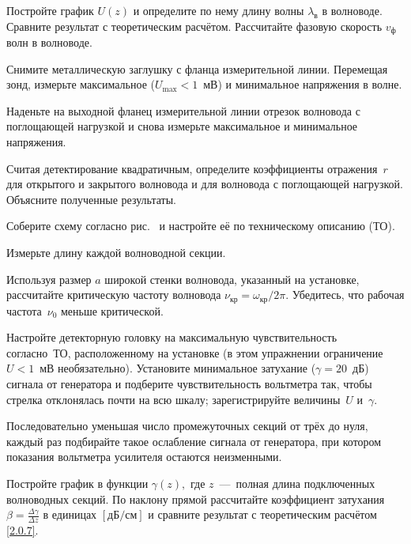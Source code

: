\begin{lab:task}
    \item Постройте график $U(z)$ и определите по нему длину волны
    $\lambda_{\text{в}}$ в волноводе. Сравните результат с теоретическим расчётом.
    Рассчитайте фазовую скорость $v_{\text{ф}}$ волн в волноводе. 
    
    
    \item Снимите металлическую заглушку с фланца измерительной линии. Перемещая
    зонд, измерьте максимальное ($U_{\text{max}}<1$~мВ) и минимальное напряжения
    в волне.
    
    \item Наденьте на выходной фланец измерительной линии отрезок волновода с
    поглощающей нагрузкой и снова измерьте максимальное и минимальное напряжения.
    
    \item Считая детектирование квадратичным, определите коэффициенты 
    отражения~$r$ для открытого и закрытого волновода и для волновода 
    с поглощающей нагрузкой. Объясните полученные результаты.
    
    
    \item Соберите схему согласно рис.~ и настройте её по
    техническому описанию (ТО).
    
    \item Измерьте длину каждой волноводной секции.
    
    \item Используя размер $a$ широкой стенки волновода, указанный на установке,
    рассчитайте критическую частоту волновода $\nu_{кр}= \omega_{кр}/2\pi$. 
    Убедитесь, что рабочая частота~$\nu_0$ меньше критической.
    
    
    \item Настройте детекторную головку на максимальную чувствительность согласно~ТО, 
    расположенному на установке (в этом упражнении ограничение $U<1$~мВ
    необязательно). Установите минимальное затухание ($\gamma=20$~дБ) сигнала от
    генератора и подберите чувствительность вольтметра так, чтобы стрелка
    отклонялась почти на всю шкалу; зарегистрируйте величины~$U$ и~$\gamma$.
    
    \item Последовательно уменьшая число промежуточных секций от трёх до нуля,
    каждый раз подбирайте такое ослабление сигнала от генератора, при котором
    показания вольтметра усилителя остаются неизменными.
    
    \item Постройте график в функции $\gamma(z),$ где $z$~---~полная длина
    подключенных волноводных секций. По наклону прямой рассчитайте коэффициент
    затухания $\beta=\frac{\Delta\gamma}{\Delta z}$ 
    в единицах $[\text{дБ}/\text{см}]$ и сравните результат с теоретическим
    расчётом \eqref{2.0.7}.
 \end{lab:task}


